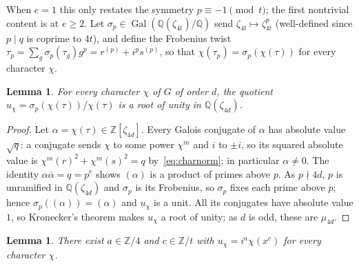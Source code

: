 \documentclass[11pt]{article}
\theoremstyle{plain}
\newtheorem{lemma}[theorem]{Lemma}
\theoremstyle{definition}
\theoremstyle{remark}
\newcommand{\Z}{\mathbb Z}
\newcommand{\Q}{\mathbb Q}
\newcommand{\Gal}{\operatorname{Gal}}
\begin{document}
When $e=1$ this only restates the symmetry $p\equiv-1\pmod t$; the first
nontrivial content is at $e\ge2$. Let $\sigma_p\in\Gal(\Q(\zeta_{4t})/\Q)$ send
$\zeta_{4t}\mapsto\zeta_{4t}^p$ (well-defined since $p\mid q$ is coprime to
$4t$), and define the Frobenius twist
$\tau_p=\sum_g\sigma_p(\tau_g)g^p=r^{(p)}+i^p s^{(p)}$, so that
$\chi(\tau_p)=\sigma_p(\chi(\tau))$ for every character $\chi$.

\begin{lemma}\label{lem:per-character-unit}
For every character $\chi$ of $G$ of order $d$, the quotient
$u_\chi=\sigma_p(\chi(\tau))/\chi(\tau)$ is a root of unity in $\Q(\zeta_{4d})$.
\end{lemma}

\begin{proof}
Let $\alpha=\chi(\tau)\in\Z[\zeta_{4d}]$. Every Galois conjugate of $\alpha$ has
absolute value $\sqrt q$: a conjugate sends $\chi$ to some power $\chi^m$ and
$i$ to $\pm i$, so its squared absolute value is $\chi^m(r)^2+\chi^m(s)^2=q$
by~\eqref{eq:charnorm}; in particular $\alpha\ne0$. The identity
$\alpha\overline\alpha=q=p^e$ shows $(\alpha)$ is a product of primes above $p$.
As $p\nmid4d$, $p$ is unramified in $\Q(\zeta_{4d})$ and $\sigma_p$ is its
Frobenius, so $\sigma_p$ fixes each prime above $p$; hence
$\sigma_p((\alpha))=(\alpha)$ and $u_\chi$ is a unit. All its conjugates have
absolute value $1$, so Kronecker's theorem makes $u_\chi$ a root of unity; as
$d$ is odd, these are $\mu_{4d}$.
\end{proof}

\begin{lemma}\label{lem:coherence}
There exist $a\in\Z/4$ and $c\in\Z/t$ with $u_\chi=i^a\chi(x^c)$ for every
character $\chi$.
\end{lemma}
\end{document}
